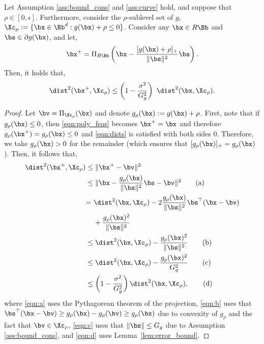 \begin{lemma}
    \label{lem:polyak_feas}
    Let Assumption \ref{ass:bound_cons} and \ref{ass:curve} hold, and suppose that $\rho \in [0,\epsilon]$.
    Furthermore, consider the $\rho$-sublevel set of $g$, $\Xc_\rho := \{ \bx \in \Rb^d : g(\bx ) + \rho \leq 0 \}$.
    Consider any $\bx \in R \Bb$ and $\bs \in \partial g(\bx)$, and let,
    \begin{equation}
        \label{eqn:poly_feas}
        \bx^+ = \Pi_{R \Bb} \left(\bx - \frac{[g(\bx) + \rho]_+}{\| \bs \|^2} \bs \right).
    \end{equation}
    Then, it holds that,
    \begin{equation}
        \label{eqn:dists}
        \dist^2(\bx^+, \Xc_\rho) \leq \left(1 - \frac{\sigma^2}{G_g^2} \right) \ \dist^2(\bx, \Xc_\rho).
    \end{equation}
\end{lemma}
\begin{proof}
    Let $\bv = \Pi_{\Xc_\rho} (\bx)$ and denote $g_\rho (\bx) := g(\bx) + \rho$.
    First, note that if $g_\rho (\bx) \leq 0$, then \eqref{eqn:poly_feas} becomes $\bx^+ = \bx$ and therefore $g_\rho(\bx^+) = g_\rho (\bx) \leq 0$ and \eqref{eqn:dists} is satisfied with both sides $0$.
    Therefore, we take $g_\rho(\bx) > 0$ for the remainder (which ensures that $[g_\rho (\bx)]_+ = g_\rho (\bx)$).
    Then, it follows that,
    \begin{align*}
        \dist^2(\bx^+, \Xc_\rho) & \leq \| \bx^+ - \bv \|^2 \\
        & \leq \| \bx - \frac{g_\rho(\bx)}{\| \bs \|^2} \bs - \bv \|^2 \tag{a} \label{eqn:a}\\
        & \begin{aligned}
            =\ & \dist^2(\bx, \Xc_\rho) - 2 \frac{g_\rho(\bx)}{\| \bs \|^2} \bs^\top (\bx - \bv)\\
            & + \frac{g_\rho(\bx)^2}{\| \bs \|^2}
        \end{aligned}  \\
        & \leq \dist^2(\bx, \Xc_\rho) - \frac{g_\rho(\bx)^2}{\| \bs \|^2} \tag{b} \label{eqn:b} \\
        & \leq \dist^2(\bx, \Xc_\rho) - \frac{g_\rho(\bx)^2}{G_g^2} \tag{c} \label{eqn:c}\\
        & \leq \left(1 - \frac{\sigma^2}{G_g^2} \right) \dist^2(\bx, \Xc_\rho), \tag{d} \label{eqn:d}
    \end{align*}
    where \eqref{eqn:a} uses the Pythagorean theorem of the projection, \eqref{eqn:b} uses that $\bs^\top (\bx - \bv) \geq g_\rho(\bx) - g_\rho(\bv) \geq g_\rho(\bx)$ due to convexity of $g_\rho$ and the fact that $\bv \in \Xc_\rho$, \eqref{eqn:c} uses that $\| \bs \| \leq G_g$ due to Assumption \ref{ass:bound_cons}, and \eqref{eqn:d} uses Lemma~\ref{lem:error_bound}.
\end{proof}

